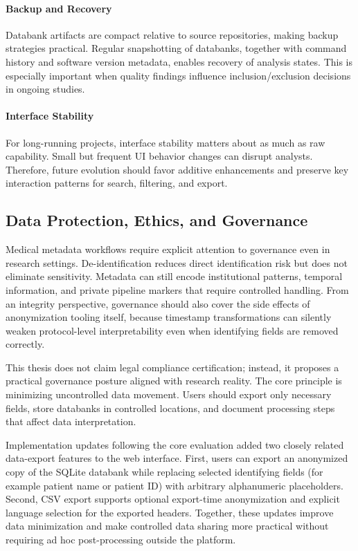 \paragraph{Backup and Recovery}
Databank artifacts are compact relative to source repositories, making backup strategies practical. Regular snapshotting of databanks, together with command history and software version metadata, enables recovery of analysis states. This is especially important when quality findings influence inclusion/exclusion decisions in ongoing studies.

\paragraph{Interface Stability}
For long-running projects, interface stability matters about as much as raw capability. Small but frequent UI behavior changes can disrupt analysts. Therefore, future evolution should favor additive enhancements and preserve key interaction patterns for search, filtering, and export.

\subsection{Data Protection, Ethics, and Governance}
Medical metadata workflows require explicit attention to governance even in research settings. De-identification reduces direct identification risk but does not eliminate sensitivity. Metadata can still encode institutional patterns, temporal information, and private pipeline markers that require controlled handling.
From an integrity perspective, governance should also cover the side effects of anonymization tooling itself, because timestamp transformations can silently weaken protocol-level interpretability even when identifying fields are removed correctly.

This thesis does not claim legal compliance certification; instead, it proposes a practical governance posture aligned with research reality. The core principle is minimizing uncontrolled data movement. Users should export only necessary fields, store databanks in controlled locations, and document processing steps that affect data interpretation.

Implementation updates following the core evaluation added two closely related data-export features to the web interface. First, users can export an anonymized copy of the SQLite databank while replacing selected identifying fields (for example patient name or patient ID) with arbitrary alphanumeric placeholders. Second, CSV export supports optional export-time anonymization and explicit language selection for the exported headers. Together, these updates improve data minimization and make controlled data sharing more practical without requiring ad hoc post-processing outside the platform.

